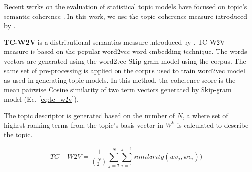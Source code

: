 Recent works on the evaluation of statistical topic models have focused on topic's semantic coherence \cite{Mimno, Ocallaghan, Roder2015}. In this work, we use the topic coherence measure introduced by \cite{Ocallaghan, Roder2015}.

\textbf{TC-W2V} is a distributional semantics measure introduced by \cite{Ocallaghan}. TC-W2V measure is based on the popular word2vec \cite{Mikolov} word embedding technique.  The words vectors are generated using the word2vec Skip-gram model using the corpus.  The same set of pre-processing is applied on the corpus used to train word2vec model as used in generating topic models. In this method, the coherence score is the mean pairwise Cosine similarity of two term vectors generated by Skip-gram model (Eq. \ref{eq:tc_w2v}). 

The topic descriptor is generated based on the number of $N$, a where set of highest-ranking terms from the topic's basis vector in $W^k$ is calculated to describe the topic. 


\begin{equation}\label{eq:tc_w2v}
TC-W2V = \frac{1}{(_{2}^{N})}  \sum_{j=2}^{N} \sum_{i=1}^{j-1} similarity (wv_j, wv_i))
\end{equation}

